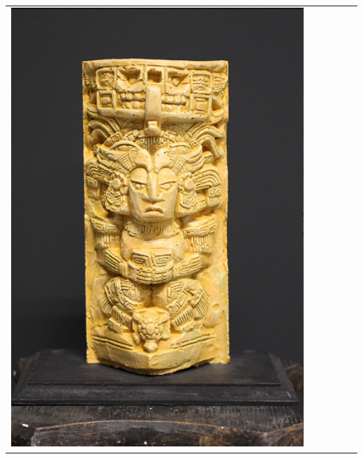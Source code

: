 \documentclass[final,12pt,3p]{elsarticle}
\begin{document}
\begin{table}
{\begin{tabular}{| c |  m{0.8cm} | m{0.8cm} | c | c | c |}
	\includegraphics[scale=0.05]{./aztec_real.png} & 

\end{tabular}}
\end{table}
\end{document}
